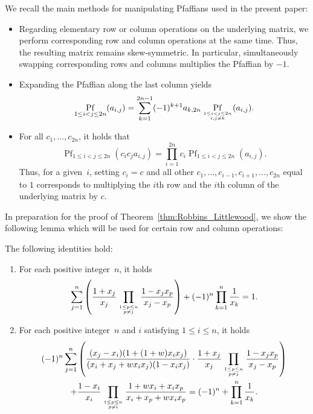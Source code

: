 \documentclass[ALCO, Unicode]{cedram}
\newcommand\myatop[2]{\genfrac{}{}{0pt}{}{#1}{#2}}
\DeclareMathOperator*{\pf}{Pf}
\begin{document}
	We recall the main methods for manipulating Pfaffians used in the present paper:
	\begin{itemize}
		\item Regarding elementary row or column operations on the underlying  matrix, we perform corresponding row and column operations at the same time. Thus, the resulting matrix remains skew-symmetric. In particular, simultaneously swapping corresponding rows and columns multiplies the Pfaffian by $-1$.
		\item Expanding the Pfaffian along the last column yields
		\begin{equation*}
			\pf_{1 \le i < j \le 2n} (a_{i,j}) = \sum_{k=1}^{2n-1} (-1)^{k+1} a_{k,2n} \pf_{\myatop{1 \le i < j \le 2n}{i,j \neq k}} (a_{i,j}).
		\end{equation*}
		\item For all $c_1,\dots,c_{2n}$, it holds that
		\begin{equation}\label{eq:linearity_pfaffian}
			\pf_{1 \le i < j \le 2n} (c_i c_j a_{i,j}) = \prod_{i=1}^{2n} c_i \pf_{1 \le i < j \le 2n} (a_{i,j}).
		\end{equation}
		Thus, for a given~$i$, setting $c_i=c$ and all other $c_1,\dots,c_{i-1},c_{i+1},\dots,c_{2n}$ equal to $1$ corresponds to multiplying the $i$th row and the $i$th column of the underlying matrix by $c$.
	\end{itemize}
	
	In preparation for the proof of Theorem~\ref{thm:Robbins_Littlewood}, we show the following lemma which will be used for certain row and column operations:
	
	\begin{lem}\label{lem:MatrixOperationEven}
		The following identities hold:
		\begin{enumerate}[label=(\roman*)]
			\item\label{eq:MatrixOperationEven2} For each positive integer~$n$, it holds
			\begin{equation*}
				\sum_{j=1}^{n} \left(\frac{1+x_j}{x_j} \prod_{\myatop{1 \le p \le n}{p \neq j}} \frac{1-x_j x_p}{x_j -x_p} \right) + (-1)^n \prod_{k=1}^{n} \frac{1}{x_k} = 1.
			\end{equation*}
			\item\label{eq:MatrixOperationEven1} For each positive integer~$n$ and $i$ satisfying $1 \le i \le n$, it holds
			\begin{multline*}
				(-1)^n \sum_{j=1}^{n} \left( \frac{(x_j-x_i)(1+(1+w) x_i x_j)}{(x_i+x_j+w x_i x_j)(1-x_i x_j)} \cdot \frac{1+x_j}{x_j} \prod_{\myatop{1 \le p \le n}{p \neq j}} \frac{1-x_j x_p}{x_j -x_p} \right)\\
				+ \frac{1-x_i}{x_i} \prod\limits_{\myatop{1 \le p \le n}{p \neq i}} \frac{1+ w x_i + x_i x_p}{x_i + x_p + w x_i x_p} = (-1)^n+\prod_{k=1}^{n} \frac{1}{x_k}.
			\end{multline*}
		\end{enumerate}
	\end{lem}
	
\end{document}
